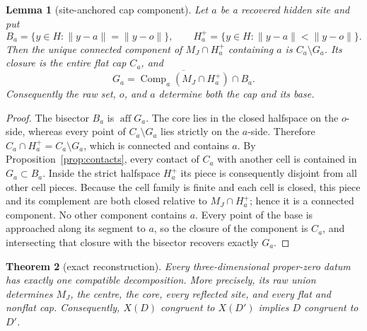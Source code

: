 \documentclass[11pt]{amsart}
\newtheorem{theorem}{Theorem}[section]
\newtheorem{lemma}[theorem]{Lemma}
\theoremstyle{definition}
\newcommand{\aff}{\operatorname{aff}}
\begin{document}
\begin{lemma}[site-anchored cap component]
\label{lem:site-component}
Let $a$ be a recovered hidden site and put
\[
 B_a=\{y\in H:\|y-a\|=\|y-o\|\},\qquad
 H_a^+=\{y\in H:\|y-a\|<\|y-o\|\}.
\]
Then the unique connected component of $M_J\cap H_a^+$ containing $a$ is
$C_a\setminus G_a$.  Its closure is the entire flat cap $C_a$, and
\[
 G_a=\overline{\operatorname{Comp}_a(M_J\cap H_a^+)}\cap B_a.
\]
Consequently the raw set, $o$, and $a$ determine both the cap and its base.
\end{lemma}

\begin{proof}
The bisector $B_a$ is $\aff G_a$.  The core lies in the closed halfspace on
the $o$-side, whereas every point of $C_a\setminus G_a$ lies strictly on the
$a$-side.  Therefore
$C_a\cap H_a^+=C_a\setminus G_a$, which is connected and contains $a$.
By Proposition~\ref{prop:contacts}, every contact of $C_a$ with another cell
is contained in $G_a\subset B_a$.  Inside the strict halfspace $H_a^+$ its
piece is consequently disjoint from all other cell pieces.  Because the cell
family is finite and each cell is closed, this piece and its complement are
both closed relative to $M_J\cap H_a^+$; hence it is a connected component.
No other component contains $a$.  Every point of the base is approached along
its segment to $a$, so the closure of the component is $C_a$, and intersecting
that closure with the bisector recovers exactly $G_a$.
\end{proof}

\begin{theorem}[exact reconstruction]
\label{thm:main}
Every three-dimensional proper-zero datum has exactly one compatible
decomposition.  More precisely, its raw union determines $M_J$, the centre,
the core, every reflected site, and every flat and nonflat cap.  Consequently,
$X(D)$ congruent to $X(D')$ implies $D$ congruent to $D'$.
\end{theorem}
\end{document}
